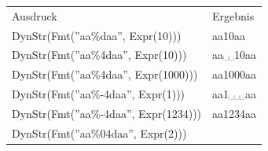 \begin{longtable}[c]{@{}ll@{}}
\hline\noalign{\medskip}
\begin{minipage}[b]{0.67\columnwidth}\raggedright
Ausdruck
\end{minipage} & \begin{minipage}[b]{0.33\columnwidth}\raggedright
Ergebnis
\end{minipage}
\\\noalign{\medskip}
\hline\noalign{\medskip}
\begin{minipage}[t]{0.67\columnwidth}\raggedright
DynStr(Fmt(''aa\%daa'', Expr(10)))
\end{minipage} & \begin{minipage}[t]{0.33\columnwidth}\raggedright
aa10aa
\end{minipage}
\\\noalign{\medskip}
\begin{minipage}[t]{0.67\columnwidth}\raggedright
DynStr(Fmt(''aa\%4daa'', Expr(10)))
\end{minipage} & \begin{minipage}[t]{0.33\columnwidth}\raggedright
aa␣␣10aa
\end{minipage}
\\\noalign{\medskip}
\begin{minipage}[t]{0.67\columnwidth}\raggedright
DynStr(Fmt(''aa\%4daa'', Expr(1000)))
\end{minipage} & \begin{minipage}[t]{0.33\columnwidth}\raggedright
aa1000aa
\end{minipage}
\\\noalign{\medskip}
\begin{minipage}[t]{0.67\columnwidth}\raggedright
DynStr(Fmt(''aa\%-4daa'', Expr(1)))
\end{minipage} & \begin{minipage}[t]{0.33\columnwidth}\raggedright
aa1␣␣␣aa
\end{minipage}
\\\noalign{\medskip}
\begin{minipage}[t]{0.67\columnwidth}\raggedright
DynStr(Fmt(''aa\%-4daa'', Expr(1234)))
\end{minipage} & \begin{minipage}[t]{0.33\columnwidth}\raggedright
aa1234aa
\end{minipage}
\\\noalign{\medskip}
\begin{minipage}[t]{0.67\columnwidth}\raggedright
DynStr(Fmt(''aa\%04daa'', Expr(2)))

\end{minipage}
\end{longtable}
